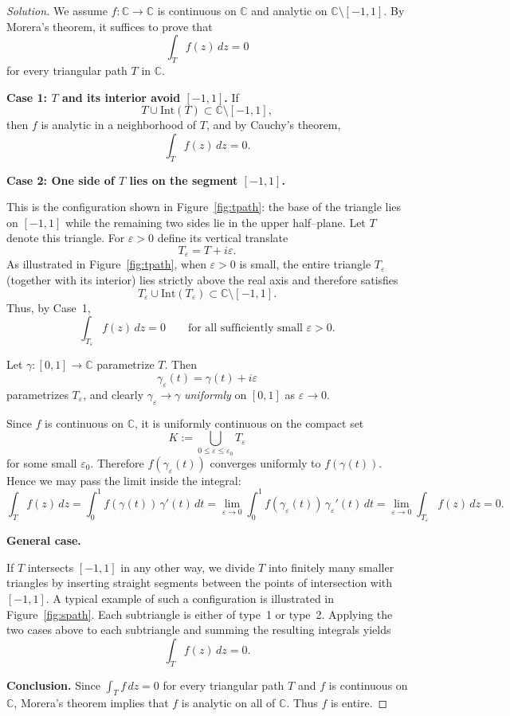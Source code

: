 \documentclass[12pt, a4paper]{report}
\theoremstyle{spaced}
\begin{document}
\begin{proof}[Solution]
	We assume $f:\mathbb{C}\to\mathbb{C}$ is continuous on $\mathbb{C}$ and analytic on
	$\mathbb{C}\setminus[-1,1]$.
	By Morera’s theorem, it suffices to prove that
	\[
		\int_T f(z)\,dz = 0
	\]
	for every triangular path $T$ in $\mathbb{C}$.

	\medskip
	\noindent\textbf{Case 1: $T$ and its interior avoid $[-1,1]$.}
	If
	\[
		T \cup \mathrm{Int}(T) \subset \mathbb{C}\setminus[-1,1],
	\]
	then $f$ is analytic in a neighborhood of $T$, and by Cauchy’s theorem,
	\[
		\int_T f(z)\,dz = 0.
	\]

	\medskip
	\noindent\textbf{Case 2: One side of $T$ lies on the segment $[-1,1]$.}

	This is the configuration shown in Figure~\ref{fig:tpath}:
	the base of the triangle lies on $[-1,1]$ while the remaining two sides lie in the upper half–plane.
	Let $T$ denote this triangle.
	For $\varepsilon>0$ define its vertical translate
	\[
		T_\varepsilon = T + i\varepsilon.
	\]
	As illustrated in Figure~\ref{fig:tpath}, when $\varepsilon>0$ is small,
	the entire triangle $T_\varepsilon$ (together with its interior) lies strictly above the real axis and therefore satisfies
	\[
		T_\varepsilon \cup \mathrm{Int}(T_\varepsilon)
		\subset\mathbb{C}\setminus[-1,1].
	\]
	Thus, by Case~1,
	\[
		\int_{T_\varepsilon} f(z)\,dz = 0
		\qquad\text{for all sufficiently small }\varepsilon>0.
	\]

	Let $\gamma:[0,1]\to\mathbb{C}$ parametrize $T$.
	Then
	\[
		\gamma_\varepsilon(t)=\gamma(t)+i\varepsilon
	\]
	parametrizes $T_\varepsilon$, and clearly $\gamma_\varepsilon\to\gamma$
	\emph{uniformly} on $[0,1]$ as $\varepsilon\to 0$.

	Since $f$ is continuous on $\mathbb{C}$, it is uniformly continuous on the compact set
	\[
		K:=\bigcup_{0\le\varepsilon\le\varepsilon_0} T_\varepsilon
	\]
	for some small $\varepsilon_0$.
	Therefore $f(\gamma_\varepsilon(t))$ converges uniformly to $f(\gamma(t))$.
	Hence we may pass the limit inside the integral:
	\[
		\int_T f(z)\,dz
		= \int_0^1 f(\gamma(t))\,\gamma'(t)\,dt
		= \lim_{\varepsilon\to 0}\int_0^1 f(\gamma_\varepsilon(t))\,\gamma_\varepsilon'(t)\,dt
		= \lim_{\varepsilon\to 0} \int_{T_\varepsilon} f(z)\,dz = 0.
	\]

	\medskip
	\noindent\textbf{General case.}

	If $T$ intersects $[-1,1]$ in any other way, we divide $T$ into finitely many smaller triangles by inserting straight segments between the points of intersection with $[-1,1]$. A typical example of such a configuration is illustrated in
	Figure~\ref{fig:spath}.
	Each subtriangle is either of type~1 or type~2.
	Applying the two cases above to each subtriangle and summing the resulting integrals yields
	\[
		\int_T f(z)\,dz = 0.
	\]

	\medskip
	\noindent\textbf{Conclusion.}
	Since $\int_T f\,dz=0$ for every triangular path $T$ and $f$ is continuous on $\mathbb{C}$,
	Morera’s theorem implies that $f$ is analytic on all of $\mathbb{C}$.
	Thus $f$ is entire.
\end{proof}
\end{document}
